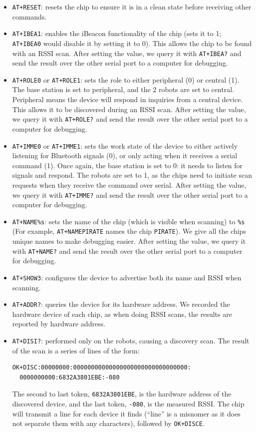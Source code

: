 \documentclass[]{article}
\begin{document}
\begin{itemize}
\item
  \texttt{AT+RESET}: resets the chip to ensure it is in a clean state
  before receiving other commands.
\item
  \texttt{AT+IBEA1}: enables the iBeacon functionality of the chip (sets
  it to 1; \texttt{AT+IBEA0} would disable it by setting it to 0). This
  allows the chip to be found with an RSSI scan. After setting the
  value, we query it with \texttt{AT+IBEA?} and send the result over the
  other serial port to a computer for debugging.
\item
  \texttt{AT+ROLE0} or \texttt{AT+ROLE1}: sets the role to either
  peripheral (0) or central (1). The base station is set to peripheral,
  and the 2 robots are set to central. Peripheral means the device will
  respond in inquiries from a central device. This allows it to be
  discovered during an RSSI scan. After setting the value, we query it
  with \texttt{AT+ROLE?} and send the result over the other serial port
  to a computer for debugging.
\item
  \texttt{AT+IMME0} or \texttt{AT+IMME1}: sets the work state of the
  device to either actively listening for Bluetooth signals (0), or only
  acting when it receives a serial command (1). Once again, the base
  station is set to 0: it needs to listen for signals and respond. The
  robots are set to 1, as the chips need to initiate scan requests when
  they receive the command over serial. After setting the value, we
  query it with \texttt{AT+IMME?} and send the result over the other
  serial port to a computer for debugging.
\item
  \texttt{AT+NAME\%s}: sets the name of the chip (which is visible when
  scanning) to \texttt{\%s} (For example, \texttt{AT+NAMEPIRATE} names
  the chip \texttt{PIRATE}). We give all the chips unique names to make
  debugging easier. After setting the value, we query it with
  \texttt{AT+NAME?} and send the result over the other serial port to a
  computer for debugging.
\item
  \texttt{AT+SHOW3}: configures the device to advertise both its name
  and RSSI when scanning.
\item
  \texttt{AT+ADDR?}: queries the device for its hardware address. We
  recorded the hardware device of each chip, as when doing RSSI scans,
  the results are reported by hardware address.
\item
  \texttt{AT+DISI?}: performed only on the robots, causing a discovery
  scan. The result of the scan is a series of lines of the form:

\begin{verbatim}
OK+DISC:00000000:00000000000000000000000000000000:
  0000000000:6832A3801EBE:-080
\end{verbatim}

  The second to last token, \texttt{6832A3801EBE}, is the hardware
  address of the discovered device, and the last token, \texttt{-080},
  is the measured RSSI. The chip will transmit a line for each device it
  finds (``line'' is a misnomer as it does not separate them with any
  characters), followed by \texttt{OK+DISCE}.
\end{itemize}
\end{document}
